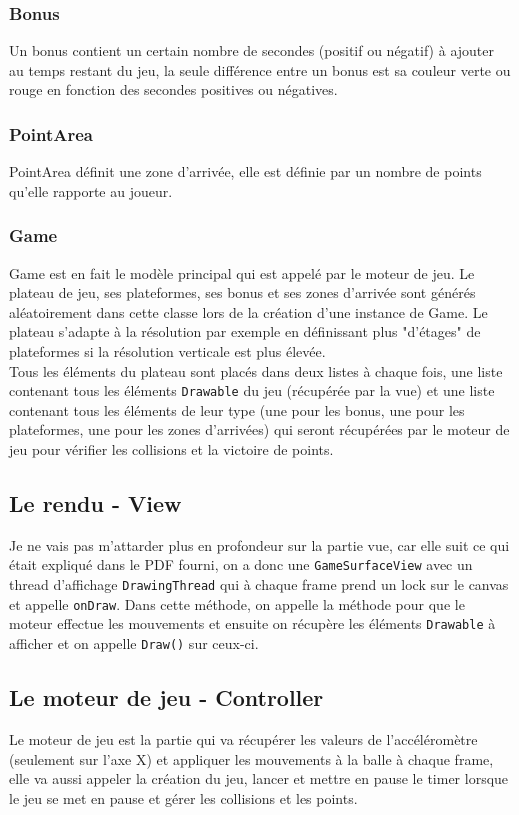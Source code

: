 \documentclass{article}
\begin{document}
\subsubsection{Bonus}
Un bonus contient un certain nombre de secondes (positif ou négatif) à ajouter au temps restant du jeu, la seule différence entre un bonus est sa couleur verte ou rouge en fonction des secondes positives ou négatives.
\subsubsection{PointArea}
PointArea définit une zone d'arrivée, elle est définie par un nombre de points qu'elle rapporte au joueur.
\subsubsection{Game}
Game est en fait le modèle principal qui est appelé par le moteur de jeu. Le plateau de jeu, ses plateformes, ses bonus et ses zones d'arrivée sont générés aléatoirement dans cette classe lors de la création d'une instance de Game. Le plateau s'adapte à la résolution par exemple en définissant plus "d'étages" de plateformes si la résolution verticale est plus élevée.\\

Tous les éléments du plateau sont placés dans deux listes à chaque fois, une liste contenant tous les éléments \verb+Drawable+ du jeu (récupérée par la vue) et une liste contenant tous les éléments de leur type (une pour les bonus, une pour les plateformes, une pour les zones d'arrivées) qui seront récupérées par le moteur de jeu pour vérifier les collisions et la victoire de points.
\subsection{Le rendu - View}
Je ne vais pas m'attarder plus en profondeur sur la partie vue, car elle suit ce qui était expliqué dans le PDF fourni, on a donc une \verb+GameSurfaceView+ avec un thread d'affichage \verb+DrawingThread+ qui à chaque frame prend un lock sur le canvas et appelle \verb+onDraw+. Dans cette méthode, on appelle la méthode pour que le moteur effectue les mouvements et ensuite on récupère les éléments \verb+Drawable+ à afficher et on appelle \verb+Draw()+ sur ceux-ci.
\subsection{Le moteur de jeu - Controller}
Le moteur de jeu est la partie qui va récupérer les valeurs de l'accéléromètre (seulement sur l'axe X) et appliquer les mouvements à la balle à chaque frame, elle va aussi appeler la création du jeu, lancer et mettre en pause le timer lorsque le jeu se met en pause et gérer les collisions et les points.
\end{document}
